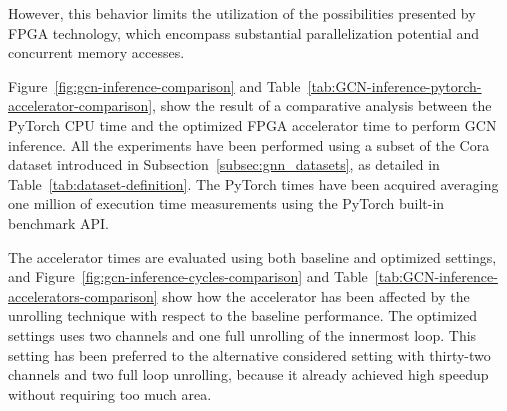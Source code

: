 However, this behavior limits the utilization of the possibilities presented by FPGA technology, which encompass substantial parallelization potential and concurrent memory accesses.

Figure~\ref{fig:gcn-inference-comparison} and Table~\ref{tab:GCN-inference-pytorch-accelerator-comparison}, show the result of a comparative analysis between the PyTorch CPU time and the optimized FPGA accelerator time to perform GCN inference.
All the experiments have been performed using a subset of the Cora dataset introduced in Subsection~\ref{subsec:gnn_datasets}, as detailed in Table~\ref{tab:dataset-definition}.
The PyTorch times have been acquired averaging one million of execution time measurements using the PyTorch built-in benchmark API\@.

The accelerator times are evaluated using both baseline and optimized settings, and Figure~\ref{fig:gcn-inference-cycles-comparison} and Table~\ref{tab:GCN-inference-accelerators-comparison} show how the accelerator has been affected by the unrolling technique with respect to the baseline performance.
The optimized settings uses two channels and one full unrolling of the innermost loop.
This setting has been preferred to the alternative considered setting with thirty-two channels and two full loop unrolling, because it already achieved high speedup without requiring too much area.

